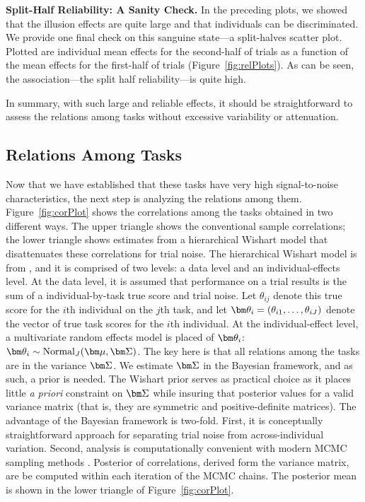 \documentclass[man, 12pt]{apa7} %
\begin{document}
{\bf Split-Half Reliability: A Sanity Check.}  In the preceding plots, we showed that the illusion effects are quite large and that individuals can be discriminated.  We provide one final check on this sanguine state---a split-halves scatter plot.  Plotted are individual mean effects for the second-half of trials as a function of the mean effects for the first-half of trials (Figure~\ref{fig:relPlots}).  As can be seen, the association---the split half reliability---is quite high.  

In summary, with such large and reliable effects, it should be straightforward to assess the relations among tasks without excessive variability or attenuation.

\subsection{Relations Among Tasks}

Now that we have established that these tasks have very high signal-to-noise characteristics, the next step is analyzing the relations among them.  Figure~\ref{fig:corPlot} shows the correlations among the tasks obtained in two different ways.  The upper triangle shows the conventional sample correlations; the lower triangle shows estimates from a hierarchical Wishart model that disattenuates these correlations for trial noise.  The hierarchical Wishart model is from \textcite{Rouder.etal.2023}, and it is comprised of two levels: a data level and an individual-effects level.  At the data level, it is assumed that performance on a trial results is the sum of a individual-by-task true score and trial noise.  Let $\theta_{ij}$ denote this true score for the $i$th individual on the $j$th task, and let $\bftheta_i=(\theta_{i1},\ldots,\theta_{iJ})$ denote the vector of true task scores for the $i$th individual.  At the individual-effect level, a multivariate random effects model is placed of $\bftheta_i$: $\bftheta_i \sim \mbox{Normal}_J(\bfmu,\bfSigma)$.  The key here is that all relations among the tasks are in the variance $\bfSigma$.  We estimate $\bfSigma$ in the Bayesian framework, and as such, a prior is needed.  The Wishart prior \parencite[]{Wishart.1928} serves as practical choice as it places little \textit{a priori} constraint on $\bfSigma$ while insuring that posterior values for a valid variance matrix (that is, they are symmetric and positive-definite matrices).  The advantage of the Bayesian framework is two-fold.  First, it is conceptually straightforward approach for separating trial noise from across-individual variation.  Second, analysis is computationally convenient with modern MCMC sampling methods \parencite[]{Gelfand.Smith.1990}.  Posterior of correlations, derived form the variance matrix, are be computed within each iteration of the MCMC chains.  The posterior mean is shown in the lower triangle of Figure~\ref{fig:corPlot}.
\end{document}
